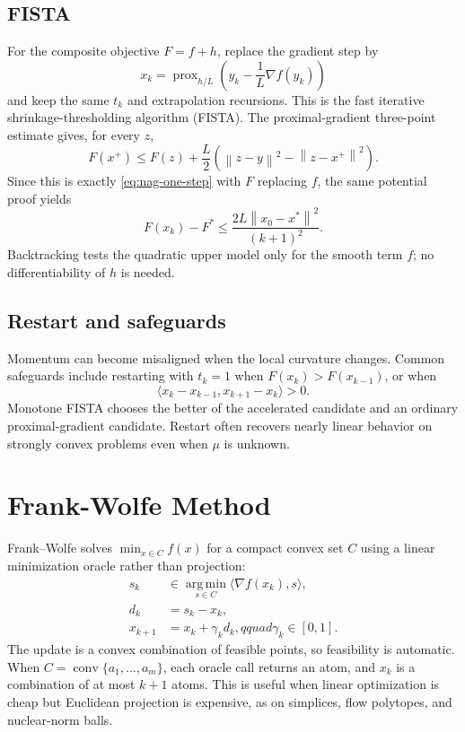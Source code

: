 \documentclass[12pt,oneside]{book}
\numberwithin{equation}{section}
\theoremstyle{definition}
\theoremstyle{plain}
\theoremstyle{remark}
\newcommand{\argmin}{\operatorname*{arg\,min}}
\newcommand{\norm}[1]{\left\lVert #1 \right\rVert}
\begin{document}
\subsection{FISTA}

For the composite objective $F=f+h$, replace the gradient step by
\[
 x_k=\operatorname{prox}_{h/L}
 \left(y_k-\frac1L\nabla f(y_k)\right)
\]
and keep the same $t_k$ and extrapolation recursions. This is the fast
iterative shrinkage-thresholding algorithm (FISTA). The proximal-gradient
three-point estimate gives, for every $z$,
\[
 F(x^+)\leq F(z)+\frac L2
 \left(\norm{z-y}^2-\norm{z-x^+}^2\right).
\]
Since this is exactly \eqref{eq:nag-one-step} with $F$ replacing $f$, the
same potential proof yields
\[
 F(x_k)-F^*\leq\frac{2L\norm{x_0-x^*}^2}{(k+1)^2}.
\]
Backtracking tests the quadratic upper model only for the smooth term $f$;
no differentiability of $h$ is needed.

\subsection{Restart and safeguards}

Momentum can become misaligned when the local curvature changes. Common
safeguards include restarting with $t_k=1$ when
$F(x_k)>F(x_{k-1})$, or when
\[
 \langle x_k-x_{k-1},x_{k+1}-x_k\rangle>0.
\]
Monotone FISTA chooses the better of the accelerated candidate and an
ordinary proximal-gradient candidate. Restart often recovers nearly linear
behavior on strongly convex problems even when $\mu$ is unknown.

\section{Frank-Wolfe Method}

Frank--Wolfe solves $\min_{x\in C}f(x)$ for a compact convex set $C$ using a
linear minimization oracle rather than projection:
\begin{align*}
 s_k&\in\argmin_{s\in C}\langle\nabla f(x_k),s\rangle,\\
 d_k&=s_k-x_k,\\
 x_{k+1}&=x_k+\gamma_kd_k,qquad \gamma_k\in[0,1].
\end{align*}
The update is a convex combination of feasible points, so feasibility is
automatic. When $C=\operatorname{conv}\{a_1,\ldots,a_m\}$, each oracle call
returns an atom, and $x_k$ is a combination of at most $k+1$ atoms. This is
useful when linear optimization is cheap but Euclidean projection is
expensive, as on simplices, flow polytopes, and nuclear-norm balls.
\end{document}

